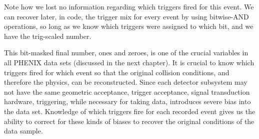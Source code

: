 Note how we lost no information regarding which triggers fired for this event.
We can recover later, in code, the trigger mix for every event by using
bitwise-AND operations, so long as we know which triggers were assigned to which
bit, and we have the trig-scaled number.

This bit-masked final number, ones and zeroes, is one of the crucial variables
in all PHENIX data sets (discussed in the next chapter). It is crucial to know
which triggers fired for which event so that the original collision conditions,
and therefore the physics, can be reconstructed. Since each detector subsystem
may not have the same geometric acceptance, trigger acceptance, signal
transduction hardware, triggering, while necessary for taking data, introduces
severe bias into the data set. Knowledge of which triggers fire for each
recorded event gives us the ability to correct for these kinds of biases to
recover the original conditions of the data sample.
